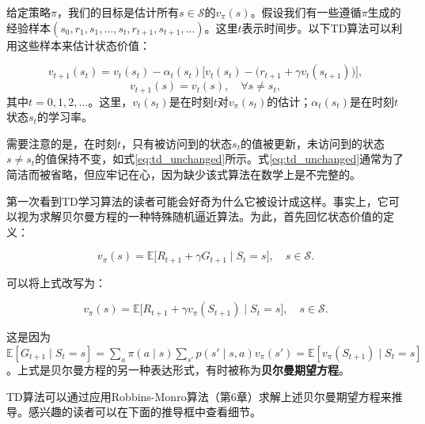 \documentclass[UTF8]{article}
\begin{document}
给定策略$\pi$，我们的目标是估计所有$s \in \mathcal{S}$的$v_\pi(s)$。假设我们有一些遵循$\pi$生成的经验样本$(s_0, r_1, s_1, \dots, s_t, r_{t+1}, s_{t+1}, \dots)$。这里$t$表示时间步。以下TD算法可以利用这些样本来估计状态价值：

\begin{equation}
v_{t+1}(s_t) = v_t(s_t) - \alpha_t(s_t)\Big[v_t(s_t) - \big(r_{t+1} + \gamma v_t(s_{t+1})\big)\Big],
\label{eq:td_state}
\end{equation}
\begin{equation}
v_{t+1}(s) = v_t(s), \quad \forall s \neq s_t,
\label{eq:td_unchanged}
\end{equation}
其中$t = 0, 1, 2, \dots$。这里，$v_t(s_t)$是在时刻$t$对$v_\pi(s_t)$的估计；$\alpha_t(s_t)$是在时刻$t$状态$s_t$的学习率。

需要注意的是，在时刻$t$，只有被访问到的状态$s_t$的值被更新，未访问到的状态$s \neq s_t$的值保持不变，如式\eqref{eq:td_unchanged}所示。式\eqref{eq:td_unchanged}通常为了简洁而被省略，但应牢记在心，因为缺少该式算法在数学上是不完整的。

第一次看到TD学习算法的读者可能会好奇为什么它被设计成这样。事实上，它可以视为求解贝尔曼方程的一种特殊随机逼近算法。为此，首先回忆状态价值的定义：

\[
v_\pi(s) = \mathbb{E}\big[R_{t+1} + \gamma G_{t+1} \mid S_t = s\big], \quad s \in \mathcal{S}.
\]

可以将上式改写为：

\[
v_\pi(s) = \mathbb{E}\big[R_{t+1} + \gamma v_\pi(S_{t+1}) \mid S_t = s\big], \quad s \in \mathcal{S}.
\]

这是因为$\mathbb{E}[G_{t+1} \mid S_t = s] = \sum_a \pi(a \mid s) \sum_{s'} p(s' \mid s, a) v_\pi(s') = \mathbb{E}[v_\pi(S_{t+1}) \mid S_t = s]$。上式是贝尔曼方程的另一种表达形式，有时被称为\textbf{贝尔曼期望方程}。

TD算法可以通过应用Robbins-Monro算法（第6章）求解上述贝尔曼期望方程来推导。感兴趣的读者可以在下面的推导框中查看细节。
\end{document}

